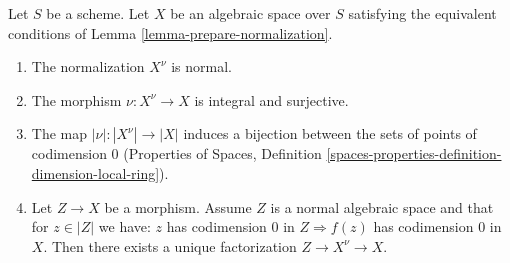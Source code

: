 \begin{lemma}
\label{lemma-normalization-normal}
Let $S$ be a scheme. Let $X$ be an algebraic space over $S$ satisfying the
equivalent conditions of Lemma \ref{lemma-prepare-normalization}.
\begin{enumerate}
\item The normalization $X^\nu$ is normal.
\item The morphism $\nu : X^\nu \to X$ is integral and surjective.
\item The map $|\nu| : |X^\nu| \to |X|$ induces a bijection between
the sets of points of codimension $0$ (Properties of Spaces,
Definition \ref{spaces-properties-definition-dimension-local-ring}).
\item Let $Z \to X$ be a morphism. Assume $Z$ is a normal algebraic space
and that for $z \in |Z|$ we have: $z$ has codimension $0$ in
$Z \Rightarrow f(z)$ has codimension $0$ in $X$. Then
there exists a unique factorization $Z \to X^\nu \to X$.
\end{enumerate}
\end{lemma}

